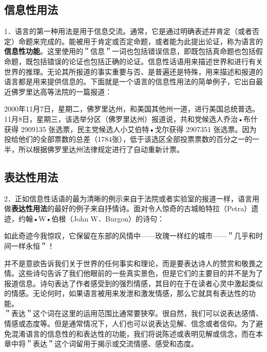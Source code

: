 \subsection{信息性用法}

1．语言的第一种用法是用于信息交流。通常，它是通过明确表述并肯定（或者否定）命题来完成的。能被用于肯定或否定命题，或者能为此提出论证，称为语言的\textbf{信息性功能}。这里使用的＂信息＂一词也包括错误信息，即既包括真命题也包括假命题，既包括错误的论证也包括正确的论证。信息性话语用来描述世界和进行有关世界的推理。无论其所报道的事实重要与否、是普遍还是特殊，用来描述和报道的语言都是用来提供信息的。下面就是一个语言的信息性用法的简单例子，它出自最近佛罗里达高等法院的一篇报道：

\begin{displayquote}
2000年11月7日，星期二，佛罗里达州，和美国其他州一道，进行美国总统普选。11月8日，星期三，该选举分区（佛罗里达州）报道说，共和党候选人乔治•布什获得 2909135 张选票，民主党候选人小艾伯特•戈尔获得 2907351 张选票。因为投给他们的全部票数的总差（1784张），低于该选区全部投票票数的百分之一的一半，所以根据佛罗里达州法律规定进行了自动重新计票。\cite{palmbeach2000}
\end{displayquote}

\subsection{表达性用法}

2．正如信息性话语的最为清晰的例示来自于法院或者实验室的报道一样，语言用做\textbf{表达性用法}的最好的例子来自抒情诗。面对令人惊奇的古城帕特拉（Petra）遗迹，约翰•W•伯根（John W．Burgon）的诗句：

\begin{displayquote}
如此奇迹今我惊叹，它保留在东部的风情中——玫瑰一样红的城市——＂几乎和时间一样永恒＂！
\end{displayquote}

并不是意欲告诉我们关于世界的任何事实和理论，而是要表达诗人的赞赏和敬畏之情。这些诗句告诉了我们他眼前的一些真实景色，但是它们的主要目的并不是为了报道信息。诗句表达了作者感受到的强烈情感，其目的在于在读者心灵中激起类似的情感。无论何时，如果语言被用来发泄和激发情感，那么它就具有表达性的功能。\\
＂表达＂这个词在这里的运用范围比通常要狭窄。很自然，我们可以说表达感情、情感或态度等。但是通常情况下，人们也可以说表达见解、信念或者信仰。为了避免混淆语言的信息性的和表达性的功能，我们将说陈述或表明见解或信念，而在本章中将＂表达＂这个词留用于揭示或交流情感、感受和态度。

